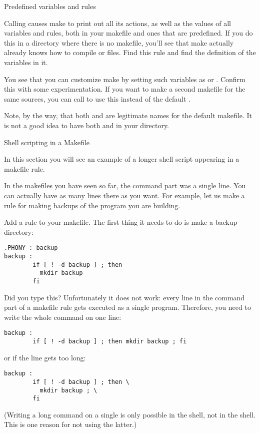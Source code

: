 
 {Predefined variables and rules}

Calling  causes make to print out all its
actions, as well as the values of all variables and rules, both in
your makefile and ones that are predefined. If you do this in a
directory where there is no makefile, you'll see that make actually
already knows how to compile  or  files. Find this rule
and find the definition of the variables in it.

You see that you can customize make by setting such variables as
 or . Confirm this with some experimentation. If
you want to make a second makefile for the same sources, you can call
 to use this instead of the default
.

Note, by the way, that both  and  are
legitimate names for the default makefile. It is not a good idea to
have both  and  in your directory.

 {Shell scripting in a Makefile}
\label{sec:make-shell}

\begin{purpose}
  In this section you will see an example of a longer shell script
  appearing in a makefile rule.
\end{purpose}

In the makefiles you have seen so far, the command part was a single
line. You can actually have as many lines there as you want.
For example, let us make a rule for making backups of the program you
are building.

Add a   rule to your makefile. The first thing it needs to
do is make a backup directory:
\begin{lstlisting}
.PHONY : backup
backup :
        if [ ! -d backup ] ; then 
          mkdir backup
        fi
\end{lstlisting}
Did you type this? Unfortunately it does not work: every line in the
command part of a makefile rule gets executed as a single
program. Therefore, you need to write the whole command on one line:
\begin{lstlisting}
backup :
        if [ ! -d backup ] ; then mkdir backup ; fi
\end{lstlisting}
or if the line gets too long:
\begin{lstlisting}
backup :
        if [ ! -d backup ] ; then \
          mkdir backup ; \
        fi
\end{lstlisting}
(Writing a long command on a single is only possible
in the  shell, not in the  shell.
This is one reason for not using the latter.)

